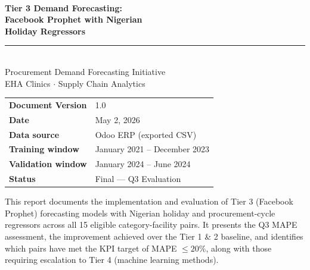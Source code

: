 \documentclass[12pt, a4paper]{article}
\begin{document}
\begin{titlepage}
  \pagecolor{ehaBlue}\color{white}
  \vspace*{1.8cm}

  {\fontsize{10}{12}\selectfont\MakeUppercase{}}\\[0.5em]
  {\fontsize{26}{32}\selectfont\bfseries Tier 3 Demand Forecasting:\\[0.3em]
   Facebook Prophet with Nigerian\\[0.3em]
   Holiday Regressors}\\[1.2em]
  \textcolor{ehaAccent}{\rule{6cm}{2pt}}\\[1.2em]

  {\large Procurement Demand Forecasting Initiative}\\[0.4em]
  {\normalsize EHA Clinics $\cdot$ Supply Chain Analytics}\\[2.5cm]

  \begin{tabular}{@{}ll}
    \textbf{Document Version}  & 1.0 \\[0.4em]
    \textbf{Date}              & May 2, 2026 \\[0.4em]
    \textbf{Data source}       & Odoo ERP (exported CSV) \\[0.4em]
    \textbf{Training window}   & January 2021 -- December 2023 \\[0.4em]
    \textbf{Validation window} & January 2024 -- June 2024 \\[0.4em]
    \textbf{Status}            & Final --- Q3 Evaluation \\
  \end{tabular}

  \vfill
  {\small\textcolor{white!70!ehaBlue}
    {This report documents the implementation and evaluation of Tier 3
     (Facebook Prophet) forecasting models with Nigerian holiday and
     procurement-cycle regressors across all 15 eligible
     category-facility pairs. It presents the Q3 MAPE assessment,
     the improvement achieved over the Tier 1 \& 2 baseline, and
     identifies which pairs have met the KPI target of MAPE
     $\leq 20\%$, along with those requiring escalation to Tier 4
     (machine learning methods).}}
\end{titlepage}
\pagecolor{white}\color{black}

\newpage
\end{document}

